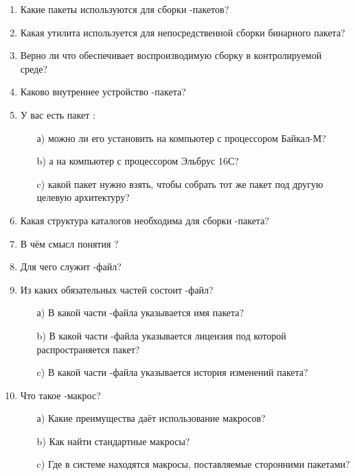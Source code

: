 \begin{enumerate}
\item Какие пакеты используются для сборки -пакетов?
\item Какая утилита используется для непосредственной сборки бинарного пакета?
\item Верно ли что  обеспечивает воспроизводимую сборку в контролируемой среде?
\item Каково внутреннее устройство -пакета?
\item У вас есть пакет :
	\begin{enumerate}
		\item[а)] можно ли его установить на компьютер с процессором Байкал-М?
		\item[b)] а на компьютер с процессором Эльбрус 16С?
		\item[c)] какой пакет нужно взять, чтобы собрать тот же пакет под другую целевую архитектуру?
	\end{enumerate}
\item Какая структура каталогов необходима для сборки -пакета?
\item В чём смысл понятия ?
\item Для чего служит -файл?
\item Из каких обязательных частей состоит -файл?
	\begin{enumerate}
		\item[а)] В какой части -файла указывается имя пакета?
		\item[b)] В какой части -файла указывается лицензия под которой распространяется пакет?
		\item[c)] В какой части -файла указывается история изменений пакета?
	\end{enumerate}
\item Что такое -макрос?
	\begin{enumerate}
		\item[а)] Какие преимущества даёт использование макросов?
		\item[b)] Как найти стандартные макросы?
		\item[c)] Где в системе находятся макросы, поставляемые сторонними пакетами?
	\end{enumerate}
\end{enumerate}

